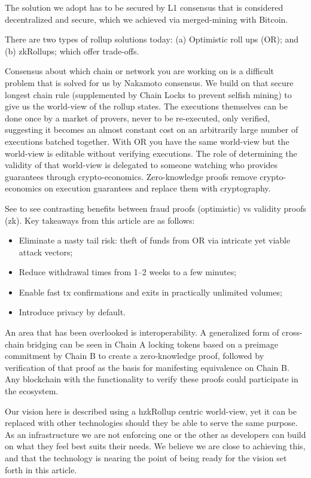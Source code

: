 \documentclass[peerreview]{ieeesyscoin}
\begin{document}
The solution we adopt has to be secured by L1 consensus that is considered decentralized and secure, which we achieved via merged-mining with Bitcoin.

There are two types of rollup solutions today: (a) Optimistic roll ups (OR); and (b) zkRollups; which offer trade-offs.

Consensus about which chain or network you are working on is a difficult problem that is solved for us by Nakamoto consensus. We build on that secure longest chain rule (supplemented by Chain Locks to prevent selfish mining) to give us the world-view of the rollup states. The executions themselves can be done once by a market of provers, never to be re-executed, only verified, suggesting it  becomes an almost constant cost on an arbitrarily large number of executions batched together. With OR you have the same world-view but the world-view is editable without verifying executions. The role of determining the validity of that world-view is delegated to someone watching who provides guarantees through crypto-economics. Zero-knowledge proofs remove crypto-economics on execution guarantees and replace them with cryptography.

See \cite{Sta19} to see contrasting benefits between fraud proofs (optimistic) vs validity proofs (zk). Key takeaways from this article are as follows:

\begin{itemize}
\item Eliminate a nasty tail risk: theft of funds from OR via intricate yet viable attack vectors;
\item Reduce withdrawal times from 1–2 weeks to a few minutes;
\item Enable fast tx confirmations and exits in practically unlimited volumes;
\item Introduce privacy by default.
\end{itemize}

An area that has been overlooked is interoperability. A generalized form of cross-chain bridging can be seen in Chain A locking tokens based on a preimage commitment by Chain B to create a zero-knowledge proof, followed by verification of that proof as the basis for manifesting equivalence on Chain B. Any blockchain with the functionality to verify these proofs could participate in the ecosystem.

Our vision here is described using a hzkRollup centric world-view, yet it can be replaced with other technologies should they be able to serve the same purpose. As an infrastructure we are not enforcing one or the other as developers can build on what they feel best suits their needs. We believe we are close to achieving this, and that the technology is nearing the point of being ready for the vision set forth in this article.
\end{document}
